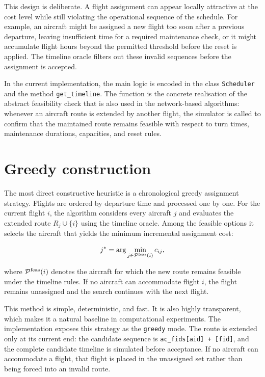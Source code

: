 This design is deliberate. A flight assignment can appear locally attractive at the cost level while still violating the operational sequence of the schedule. For example, an aircraft might be assigned a new flight too soon after a previous departure, leaving insufficient time for a required maintenance check, or it might accumulate flight hours beyond the permitted threshold before the reset is applied. The timeline oracle filters out these invalid sequences before the assignment is accepted.

In the current implementation, the main logic is encoded in the class \texttt{Scheduler} and the method \texttt{get\_timeline}. The function is the concrete realisation of the abstract feasibility check that is also used in the network-based algorithms: whenever an aircraft route is extended by another flight, the simulator is called to confirm that the maintained route remains feasible with respect to turn times, maintenance durations, capacities, and reset rules.

\section{Greedy construction}
\label{sec:heuristic_greedy}

The most direct constructive heuristic is a chronological greedy assignment strategy. Flights are ordered by departure time and processed one by one. For the current flight $i$, the algorithm considers every aircraft $j$ and evaluates the extended route $R_j \cup \{i\}$ using the timeline oracle. Among the feasible options it selects the aircraft that yields the minimum incremental assignment cost:

\begin{equation}
    j^{*} = \arg\min_{j\in\mathcal{P}^{\mathrm{feas}}(i)} c_{ij},
\end{equation}

where $\mathcal{P}^{\mathrm{feas}}(i)$ denotes the aircraft for which the new route remains feasible under the timeline rules. If no aircraft can accommodate flight $i$, the flight remains unassigned and the search continues with the next flight.

This method is simple, deterministic, and fast. It is also highly transparent, which makes it a natural baseline in computational experiments. The implementation exposes this strategy as the \texttt{greedy} mode. The route is extended only at its current end: the candidate sequence is \texttt{ac\_fids[aid] + [fid]}, and the complete candidate timeline is simulated before acceptance. If no aircraft can accommodate a flight, that flight is placed in the unassigned set rather than being forced into an invalid route.

